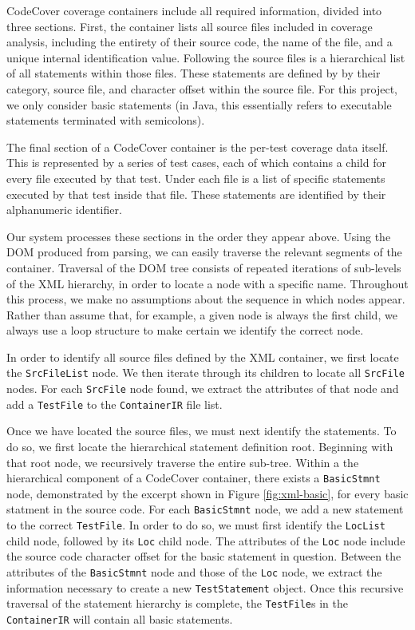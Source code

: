 CodeCover coverage containers include all required
information, divided into three sections.  First, the container lists all source
files included in coverage analysis, including the entirety of their source code,
the name of the file, and a unique internal identification value.  Following the source files
is a hierarchical list of all statements within those files.  These statements are defined by 
by their category, source file, and character offset within the source file.  For this
project, we only consider basic statements (in Java, this essentially refers to executable
statements terminated with semicolons).  

The final section of a CodeCover container is the per-test coverage data itself.  This is
represented by a series of test cases, each of which contains a child for every file
executed by that test. Under each file is a list of specific statements executed by that
test inside that file.  These statements are identified by their alphanumeric identifier.

Our system processes these sections in the order they appear above.  Using the DOM produced
from parsing, we can easily traverse the relevant segments of the container.  Traversal of
the DOM tree consists of repeated iterations of sub-levels of the XML hierarchy, in order
to locate a node with a specific name.  Throughout this process, we make no assumptions about
the sequence in which nodes appear.  Rather than assume that, for example, a given node is
always the first child, we always use a loop structure to make certain we identify the correct
node.

In order to identify all source files defined by the
XML container, we first locate the \texttt{SrcFileList} node.  We then iterate through its
children to locate all \texttt{SrcFile} nodes.  For each \texttt{SrcFile} node found, we 
extract the attributes of that node and add a \texttt{TestFile} to the \texttt{ContainerIR}
file list.  

Once we have located the source files, we must next identify the statements.  To do so, we first
locate the hierarchical statement definition root.  Beginning with that root node, we recursively
traverse the entire sub-tree.  Within a the hierarchical component of a CodeCover container, there
exists a \texttt{BasicStmnt} node, demonstrated by the excerpt shown in Figure \ref{fig:xml-basic}, for every basic statment in the source code.  For each \texttt{BasicStmnt} node, we add a new statement to the 
correct \texttt{TestFile}.  In order to do so, we must first identify the \texttt{LocList} child
node, followed by its \texttt{Loc} child node.  The attributes of the \texttt{Loc} node include
the source code character offset for the basic statement in question.  Between the attributes of
the \texttt{BasicStmnt} node and those of the \texttt{Loc} node, we extract the information
necessary to create a new \texttt{TestStatement} object.  Once this recursive traversal of the
statement hierarchy is complete, the \texttt{TestFile}s in the \texttt{ContainerIR} will contain
all basic statements.

